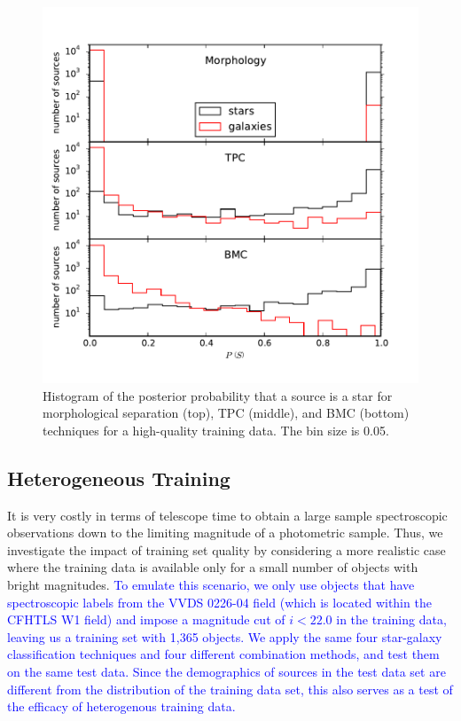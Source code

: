 \documentclass[useAMS,usenatbib]{mn2e}
\begin{document}
\begin{figure}
  \includegraphics[width=\linewidth]{figures/p_dist.pdf}
  \caption{Histogram of the posterior probability that
           a source is a star for morphological separation (top),
           TPC (middle), and BMC (bottom) techniques
           for a high-quality training data.
           The bin size is 0.05.}
  \label{fig:p_dist_all}
\end{figure}



\subsection{Heterogeneous Training}
  \label{section:poor_training}
 
It is very costly in terms of telescope time to
obtain a large sample spectroscopic observations
down to the limiting magnitude of a photometric sample.
Thus, we investigate the impact of training set quality
by considering a more realistic case
where the training data is available
only for a small number of objects with bright magnitudes.
\textcolor{blue}{ To emulate this scenario,
we only use objects that have spectroscopic labels
from the VVDS 0226-04 field (which is located within the CFHTLS W1 field)
and impose a magnitude cut of $i < 22.0$ in the training data,
leaving us a training set with 1,365 objects.
We apply the same four star-galaxy classification techniques
and four different combination methods,
and test them on the same test data.
Since the demographics of sources in the test data set
are different from the distribution of the training data set,
this also serves as a test of the efficacy of heterogenous training data.}
\end{document}
